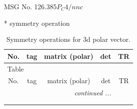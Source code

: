 \documentclass[fleqn,8pt]{jsarticle}
\begin{document}
\setcounter{MaxMatrixCols}{32}

\renewcommand{\tablename}{Table~}
\renewcommand{\figurename}{Figure~}
\begin{center}
\LARGE
MSG No. 126.385\quad$P_{C}4/nnc$
\end{center}
* symmetry operation
\renewcommand{\arraystretch}{1.3}
\begin{longtable}{ccccc}
\caption{Symmetry operations for 3d polar vector.}
 \\
 \hline \hline
No. & tag & matrix (polar) & det & TR \\ \hline \endfirsthead

\multicolumn{4}{l}{\tablename\ \thetable{}} \\
 \hline \hline
No. & tag & matrix (polar) & det & TR \\ \hline \endhead

 \hline \hline
\multicolumn{4}{r}{\footnotesize\it continued ...} \\ \endfoot

 \hline \hline
\multicolumn{4}{r}{} \\ \endlastfoot


\end{longtable}
\end{document}
